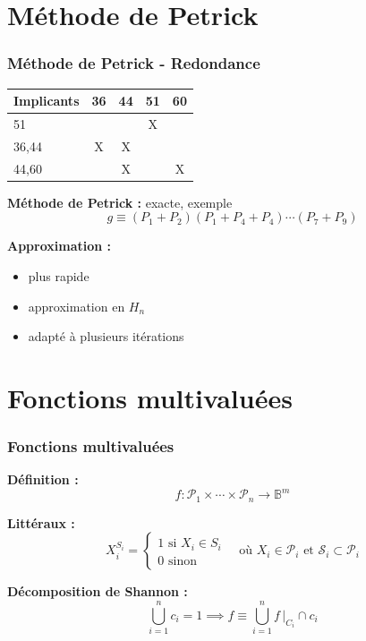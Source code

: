 \documentclass[handout]{beamer}
\begin{document}
\section{M\'ethode de Petrick}
\begin{frame}
  \frametitle{M\'ethode de Petrick - Redondance}
  
  \begin{minipage}[c][6cm]{\hsize}\centering
    \begin{tabular}{|l|c|c|c|c|}
      \hline %
      Implicants & 36 & 44 & 51 & 60  \\ \hline
      51 &  &  & X &  \\ \hline
      36,44 & X & X &  &    \\ \hline
      44,60 &  & X &  & X \\ \hline
    \end{tabular}
    \newline
    
  \end{minipage}

  \textbf{Méthode de Petrick :} exacte, exemple
  \[ g \equiv (P_1+P_2)(P_1+P_4+P_4)\cdots(P_7+P_9) \]

  \textbf{Approximation :}
  \begin{itemize}
  \item plus rapide
  \item approximation en $H_n$
  \item adapté à plusieurs itérations
  \end{itemize}
\end{frame}

\section{Fonctions multivaluées}
\begin{frame}
  \frametitle{Fonctions multivaluées}

  \textbf{Définition :}
  \[ f: \mathcal{P}_1 \times \cdots \times \mathcal{P}_n \longrightarrow \mathbb{B}^m \]

  \textbf{Littéraux :} 
  \[X_i^{S_i} = %
  \begin{cases}
    1 \text{ si } X_i \in S_i \\
    0 \text{ sinon}
  \end{cases}
  \quad \text{où } X_i \in \mathcal{P}_i \text{ et } \mathcal{S}_i \subset \mathcal{P}_i \]

  \textbf{Décomposition de Shannon :}
  \[ \bigcup_{i=1}^n c_i = 1 \implies f \equiv \bigcup_{i=1}^{n} f\,|_{C_i} \cap c_i \]

\end{frame}
\end{document}
